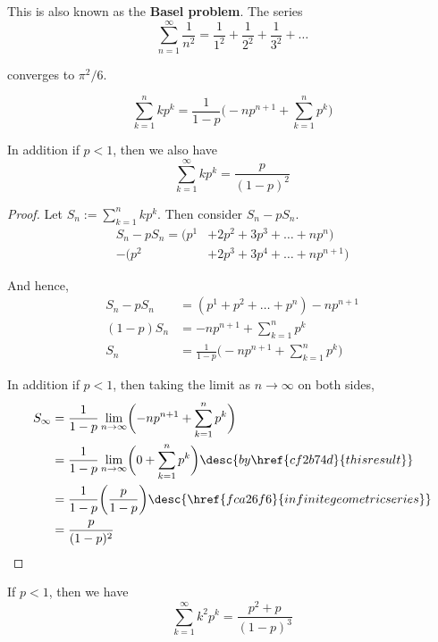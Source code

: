 \label{e664113}

This is also known as the \textbf{Basel problem}. The series
$$
  \sum_{n=1}^\infty\frac1{n^2}=\frac1{1^2}+\frac1{2^2}+\frac1{3^2}+\ldots
$$

converges to $\pi^2/6$.

\label{a5b19a9}

$$
  \sum_{k=1}^nkp^k=\frac1{1-p}\biggl(-np^{n+1}+\sum_{k=1}^np^k\biggr)
$$

In addition if $p<1$, then we also have
$$
  \sum_{k=1}^\infty kp^k=\frac p{(1-p)^2}
$$

\begin{proof}
  Let $S_n:=\sum_{k=1}^nkp^k$. Then consider $S_n-pS_n$.
  \begin{align*}
    S_n-pS_n =(p^1 &+2p^2+3p^3+\ldots+np^n)     \\
    -(p^2          &+2p^3+3p^4+\ldots+np^{n+1})
  \end{align*}

  And hence,
  \begin{align*}
    S_n-pS_n &=(p^1+p^2+\ldots+p^n)-np^{n+1}                      \\
    (1-p)S_n &=-np^{n+1}+\sum_{k=1}^np^k                          \\
    S_n      &=\frac1{1-p}\biggl(-np^{n+1}+\sum_{k=1}^np^k\biggr)
  \end{align*}

  In addition if $p<1$, then taking the limit as $n\to\infty$ on both sides,
  \begin{align*}
    S_\infty
     &=\frac1{1-p}\lim_{n\to\infty}\biggl(-np^{n+1}+\sum_{k=1}^np^k\biggr)                              \\
     &=\frac1{1-p}\lim_{n\to\infty}\biggl(0+\sum_{k=1}^np^k\biggr)\desc{by \href{cf2b74d}{this result}} \\
     &=\frac1{1-p}\biggl(\frac p{1-p}\biggr)\desc{\href{fca26f6}{infinite geometric series}}            \\
     &=\frac p{(1-p)^2}
  \end{align*}
\end{proof}

\label{ad69980}

If $p<1$, then we have
$$
  \sum_{k=1}^\infty k^2p^k=\frac{p^2+p}{(1-p)^3}
$$

